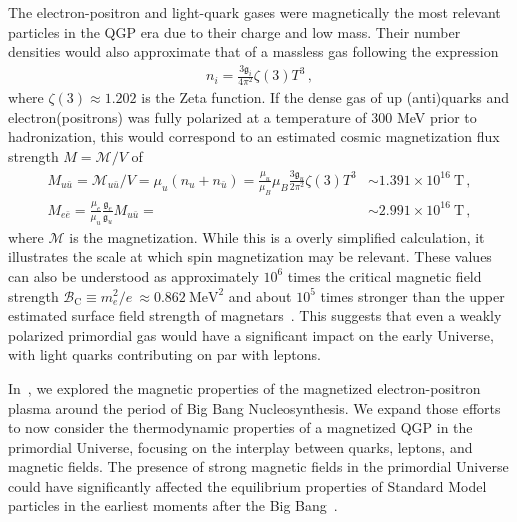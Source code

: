 \documentclass[epjST]{svjour}
\numberwithin{equation}{section}
\begin{document}
The electron-positron and light-quark gases were magnetically the most relevant particles in the QGP era due to their charge and low mass. Their number densities would also approximate that of a massless gas following the expression
\begin{align}
    n_{i} = \frac{3\mathfrak{g}_{i}}{4\pi^{2}}\zeta(3)T^{3}\,,
\end{align}
where \(\zeta(3)\approx1.202\) is the Zeta function. If the dense gas of up (anti)quarks and electron(positrons) was fully polarized at a temperature of \(300\) MeV prior to hadronization, this would correspond to an estimated cosmic magnetization flux strength \(M = \mathcal{M}/V\) of
\begin{align}
    M_{u\bar{u}} = \mathcal{M}_{u\bar{u}}/V = \mu_{u}(n_{u}+n_{\bar{u}}) = \frac{\mu_{u}}{\mu_{B}}\mu_{B}\frac{3\mathfrak{g}_{u}}{2\pi^{2}}\zeta(3)T^{3} & \sim 1.391\times10^{16}\ \mathrm{T}\,,\\
    M_{e\bar{e}} = \frac{\mu_{e}}{\mu_{u}} \frac{\mathfrak{g}_{e}}{\mathfrak{g}_{u}} M_{u\bar{u}} = & \sim 2.991\times10^{16}\ \mathrm{T}\,,
\end{align}
where \(\mathcal{M}\) is the magnetization. While this is a overly simplified calculation, it illustrates the scale at which spin magnetization may be relevant. These values can also be understood as approximately \(10^{6}\) times the critical magnetic field strength \(\mathcal{B}_\mathrm{C}\equiv m_{e}^{2}/e\ \approx 0.862\ \mathrm{MeV}^{2}\) and about \(10^5\) times stronger than the upper estimated surface field strength of magnetars~\cite{Kaspi:2017fwg}. This suggests that even a weakly polarized primordial gas would have a significant impact on the early Universe, with light quarks contributing on par with leptons.

In~\cite{Steinmetz:2023nsc,Steinmetz:2023ucp}, we explored the magnetic properties of the magnetized electron-positron plasma around the period of Big Bang Nucleosynthesis. We expand those efforts to now consider the thermodynamic properties of a magnetized QGP in the primordial Universe, focusing on the interplay between quarks, leptons, and magnetic fields. The presence of strong magnetic fields in the primordial Universe could have significantly affected the equilibrium properties of Standard Model particles in the earliest moments after the Big Bang~\cite{Durrer:2013pga,Subramanian:2015lua}.

\end{document}
